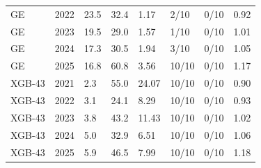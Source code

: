 \begin{table}[H]
\begin{tabular}{llllllll}
GE & 2022 & 23.5 & 32.4 & 1.17 & 2/10 & 0/10 & 0.92 \\
GE & 2023 & 19.5 & 29.0 & 1.57 & 1/10 & 0/10 & 1.01 \\
GE & 2024 & 17.3 & 30.5 & 1.94 & 3/10 & 0/10 & 1.05 \\
GE & 2025 & 16.8 & 60.8 & 3.56 & 10/10 & 0/10 & 1.17 \\
XGB-43 & 2021 & 2.3 & 55.0 & 24.07 & 10/10 & 0/10 & 0.90 \\
XGB-43 & 2022 & 3.1 & 24.1 & 8.29 & 10/10 & 0/10 & 0.93 \\
XGB-43 & 2023 & 3.8 & 43.2 & 11.43 & 10/10 & 0/10 & 1.02 \\
XGB-43 & 2024 & 5.0 & 32.9 & 6.51 & 10/10 & 0/10 & 1.06 \\
XGB-43 & 2025 & 5.9 & 46.5 & 7.99 & 10/10 & 0/10 & 1.18 \\
\bottomrule
\end{tabular}
\end{table}